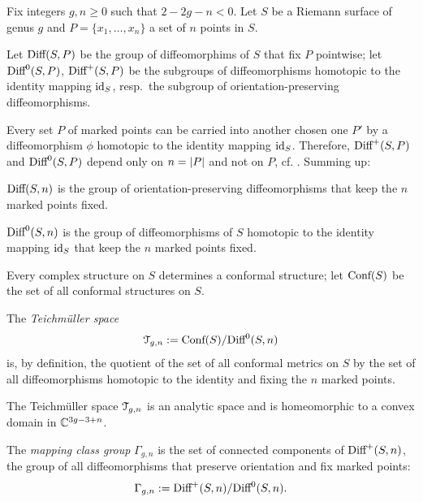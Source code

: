 Fix integers $g,n\geq0$ such that $2 -2g - n < 0$. Let $S$ be a Riemann
surface of genus $g$ and $P = \{ x_1, \ldots, x_n \}$ a set of $n$ points
in $S$.  

Let $\textrm{Diff}(S,P)$ be the group of diffeomorphims of $S$ that fix $P$
pointwise; let $\textrm{Diff}^0(S,P)$,
$\textrm{Diff}^+(S,P)$ be the subgroups of diffeomorphisms homotopic to the
identity mapping $\operatorname{id}_S$, resp.\ the subgroup of
orientation-preserving diffeomorphisms.

Every set $P$ of marked points can be carried into another chosen one
$P'$ by a diffeomorphism $\phi$ homotopic to the identity mapping
$\operatorname{id}_S$.  Therefore, $\textrm{Diff}^+(S,P)$ and $\textrm{Diff}^0(S, P)$ depend only on
$n = \lvert P\rvert$ and not on $P$, cf. \cite{krushkal;riemann-surfaces}.
Summing up:
\begin{definition}\label{dfn:diff}
  $\textrm{Diff}(S,n)$ is the group of orientation-preserving diffeomorphisms
  that keep the $n$ marked points fixed.

  $\textrm{Diff}^0(S,n)$ is the group of diffeomorphisms of $S$ homotopic to
  the identity mapping $\operatorname{id}_S$ that keep the $n$ marked points fixed.
\end{definition}

Every complex structure  on $S$ determines a conformal structure; let
$\text{\rm Conf}(S)$ be the set of all conformal structures on $S$. 
\begin{definition}\label{dfn:teichmuller}
  The \emph{Teichm{\"u}ller space}
  \begin{equation*}
    \mathcal{T}_{g,n} := \text{\rm Conf}(S) / \textrm{Diff}^0(S, n)
  \end{equation*}
  is, by definition, the quotient of the set of all conformal metrics on
  $S$ by the set of all diffeomorphisms homotopic to the identity and
  fixing the $n$ marked points.
\end{definition}
The Teichm{\"u}ller space $\mathcal{T}_{g,n}$ is an analytic space and is
homeomorphic to a convex domain in $\mathbb{C}^{3g - 3 + n}$.

\begin{definition}\label{dfn:mapping-class-group}
  The \emph{mapping class group} $\Gamma_{g,n}$ is the set of connected
  components of $\textrm{Diff}^+(S, n)$, the group of all diffeomorphisms that
  preserve orientation and fix marked points:
  \begin{equation*}
    \Gamma_{g,n} := \textrm{Diff}^+ (S, n) / \textrm{Diff}^0(S, n).
  \end{equation*}
\end{definition}


